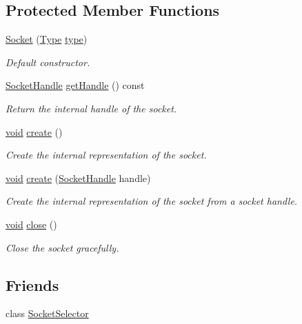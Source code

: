 \subsection*{Protected Member Functions}
\begin{DoxyCompactItemize}
\item 
\hyperlink{classsf_1_1_socket_a80ffb47ec0bafc83af019055d3e6a303}{Socket} (\hyperlink{classsf_1_1_socket_a5d3ff44e56e68f02816bb0fabc34adf8}{Type} \hyperlink{gl3_8h_a984aabed544368e7fe0e566d7cf014a7}{type})
\begin{DoxyCompactList}\small\item\em Default constructor. \end{DoxyCompactList}\item 
\hyperlink{namespacesf_aefabb521d8f5eec9e6a9b521271d20d1}{Socket\-Handle} \hyperlink{classsf_1_1_socket_ac0c63b13e61da8294bf54e888e97f9a3}{get\-Handle} () const 
\begin{DoxyCompactList}\small\item\em Return the internal handle of the socket. \end{DoxyCompactList}\item 
\hyperlink{glutf90_8h_ac778d6f63f1aaf8ebda0ce6ac821b56e}{void} \hyperlink{classsf_1_1_socket_aafbe140f4b1921e0d19e88cf7a61dcbc}{create} ()
\begin{DoxyCompactList}\small\item\em Create the internal representation of the socket. \end{DoxyCompactList}\item 
\hyperlink{glutf90_8h_ac778d6f63f1aaf8ebda0ce6ac821b56e}{void} \hyperlink{classsf_1_1_socket_af1dd898f7aa3ead7ff7b2d1c20e97781}{create} (\hyperlink{namespacesf_aefabb521d8f5eec9e6a9b521271d20d1}{Socket\-Handle} handle)
\begin{DoxyCompactList}\small\item\em Create the internal representation of the socket from a socket handle. \end{DoxyCompactList}\item 
\hyperlink{glutf90_8h_ac778d6f63f1aaf8ebda0ce6ac821b56e}{void} \hyperlink{classsf_1_1_socket_a71f2f5c2aa99e01cafe824fee4c573be}{close} ()
\begin{DoxyCompactList}\small\item\em Close the socket gracefully. \end{DoxyCompactList}\end{DoxyCompactItemize}
\subsection*{Friends}
\begin{DoxyCompactItemize}
\item 
class \hyperlink{classsf_1_1_socket_a23fafd48278ea4f8f9c25f1f0f43693c}{Socket\-Selector}
\end{DoxyCompactItemize}
